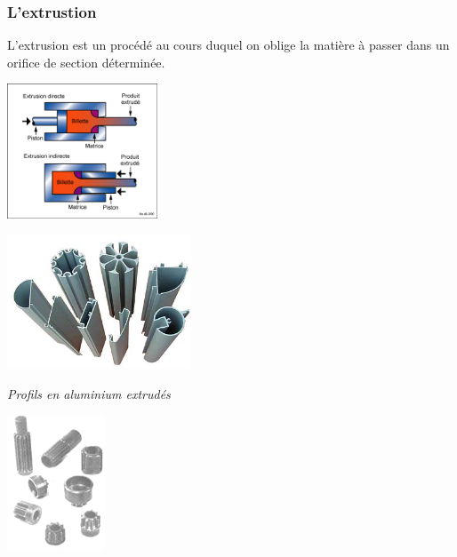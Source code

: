 \documentclass[11pt,oneside]{article}
\begin{document}
\subsubsection{L'extrustion}

L'extrusion est un procédé au cours duquel on oblige la matière à passer dans  un orifice de section déterminée. 


\begin{minipage}[c]{.3\linewidth}
\begin{center}
\includegraphics[height=4cm]{png/extrusion_schema}
\end{center}
\end{minipage}\hfill
\begin{minipage}[c]{.3\linewidth}
\begin{center}
\includegraphics[height=4cm]{png/profils_extrudes}

\textit{Profils en aluminium extrudés \cite{extrusion}}
\end{center}
\end{minipage}\hfill
\begin{minipage}[c]{.3\linewidth}
\begin{center}
\includegraphics[height=4cm]{png/profils_extrudes2}
\end{center}
\end{minipage}
\end{document}

